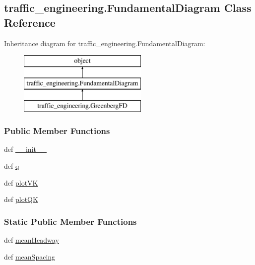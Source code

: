 \hypertarget{classtraffic__engineering_1_1FundamentalDiagram}{\subsection{traffic\-\_\-engineering.\-Fundamental\-Diagram Class Reference}
\label{classtraffic__engineering_1_1FundamentalDiagram}
}
Inheritance diagram for traffic\-\_\-engineering.\-Fundamental\-Diagram\-:\begin{figure}[H]
\begin{center}
\leavevmode
\includegraphics[height=3.000000cm]{classtraffic__engineering_1_1FundamentalDiagram}
\end{center}
\end{figure}
\subsubsection*{Public Member Functions}
\begin{DoxyCompactItemize}
\item 
def \hyperlink{classtraffic__engineering_1_1FundamentalDiagram_ac169210ecd9fc3bdc667c5a3e537c33c}{\-\_\-\-\_\-init\-\_\-\-\_\-}
\item 
def \hyperlink{classtraffic__engineering_1_1FundamentalDiagram_a4164af14787ea9a33e14fa7951dd0a89}{q}
\item 
def \hyperlink{classtraffic__engineering_1_1FundamentalDiagram_a9aeca0e6b4838b1a39fbf7676f542af3}{plot\-V\-K}
\item 
def \hyperlink{classtraffic__engineering_1_1FundamentalDiagram_a3344d9b165822c29320ee42397cf1c7e}{plot\-Q\-K}
\end{DoxyCompactItemize}
\subsubsection*{Static Public Member Functions}
\begin{DoxyCompactItemize}
\item 
def \hyperlink{classtraffic__engineering_1_1FundamentalDiagram_a0e878df5457a0d35c6386b960e0ad618}{mean\-Headway}
\item 
def \hyperlink{classtraffic__engineering_1_1FundamentalDiagram_ae211a3b47f9d7243ce1db13cd112720f}{mean\-Spacing}
\end{DoxyCompactItemize}
